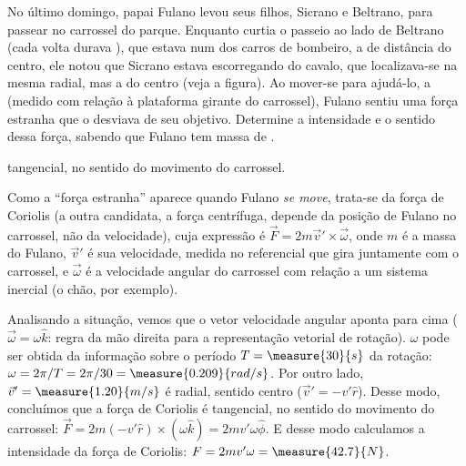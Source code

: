 \begin{question}
	No último domingo, papai Fulano levou seus filhos, Sicrano e Beltrano, para passear no carrossel do parque.
	Enquanto curtia o passeio ao lado de Beltrano (cada volta durava ), que estava num dos carros de bombeiro, a  de distância do centro, ele notou que Sicrano estava escorregando do cavalo, que localizava-se na mesma radial, mas a  do centro (veja a figura).
	Ao mover-se para ajudá-lo, a  (medido com relação à plataforma girante do carrossel), Fulano sentiu uma força estranha que o desviava de seu objetivo.
	Determine a intensidade e o sentido dessa força, sabendo que Fulano tem massa de .

	\begin{answer}
		 tangencial, no sentido do movimento do carrossel.
	\end{answer}


	\begin{solution}
		Como a ``força estranha'' aparece quando Fulano \emph{se move}, trata-se da força de Coriolis (a outra candidata, a força centrífuga, depende da posição de Fulano no carrossel, não da velocidade), cuja expressão é $\vec F = 2m\vec v' \times \vec \omega$, onde $m$ é a massa do Fulano, $\vec v'$ é sua velocidade, medida no referencial que gira juntamente com o carrossel, e $\vec\omega$ é a velocidade angular do carrossel com relação a um sistema inercial (o chão, por exemplo).

		Analisando a situação, vemos que o vetor velocidade angular aponta para cima ($\vec\omega = \omega\hat k$: regra da mão direita para a representação vetorial de rotação). $\omega$ pode ser obtida da informação sobre o período $T = \measure{30}{s}$ da rotação: $\omega = 2\pi/T = 2\pi/30 = \measure{0.209}{rad/s}$. Por outro lado, $\vec v' = \measure{1.20}{m/s}$ é radial, sentido centro ($\vec v' = -v'\hat r$).
		Desse modo, concluímos que a força de Coriolis é tangencial, no sentido do movimento do carrossel: $\vec F = 2m(-v'\hat r)\times(\omega \hat k) = 2mv'\omega \hat \phi$. E desse modo calculamos a intensidade da força de Coriolis: $F = 2mv'\omega = \measure{42.7}{N}$.
	\end{solution}
\end{question}
